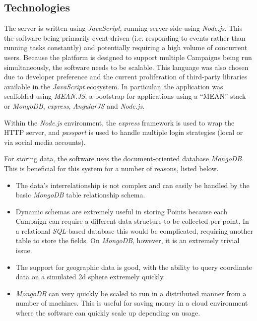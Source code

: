 \documentclass{article}
\begin{document}
		\subsection{Technologies}

		The server is written using \emph{JavaScript}, running server-side using \emph{Node.js}. This the software being primarily event-driven (i.e. responding to events rather than running tasks constantly) and potentially requiring a high volume of concurrent users\cite{tilkov_node.js:_2010}. Because the platform is designed to support multiple Campaigns being run simultaneously, the software needs to be scalable. This language was also chosen due to developer preference and the current proliferation of third-party libraries available in the \emph{JavaScript} ecosystem. In particular, the application was scaffolded using \emph{MEAN.JS}, a bootstrap for applications using a ``MEAN'' stack - or \emph{MongoDB}, \emph{express}, \emph{AngularJS} and \emph{Node.js}.

		Within the \emph{Node.js} environment, the \emph{express} framework is used to wrap the HTTP server, and \emph{passport} is used to handle multiple login strategies (local or via social media accounts).

		For storing data, the software uses the document-oriented database \emph{MongoDB}. This is beneficial for this system for a number of reasons, listed below.

		\begin{itemize}
			\item The data's interrelationship is not complex and can easily be handled by the basic \emph{MongoDB} table relationship schema.
			\item Dynamic schemas are extremely useful in storing Points because each Campaign can require a different data structure to be collected per point. In a relational \emph{SQL}-based database this would be complicated, requiring another table to store the fields. On \emph{MongoDB}, however, it is an extremely trivial issue.
			\item The support for geographic data is good, with the ability to query coordinate data on a simulated 2d sphere extremely quickly.
			\item \emph{MongoDB} can very quickly be scaled to run in a distributed manner from a number of machines. This is useful for saving money in a cloud environment where the software can quickly scale up depending on usage.
		\end{itemize}
\end{document}
